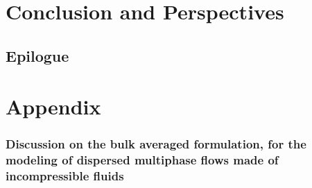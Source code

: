 \documentclass[
    a4paper,                            %
    12pt,                               %
    twoside,                            %
    open=right,                         %
]{My_book}
\begin{document}


\part*{Conclusion and Perspectives}


\chapter*{Epilogue}




\appendix
\renewcommand{\thesection}{\Alph{section}}
\renewcommand{\thesubsection}{\Alph{section}.\arabic{subsection}}
\part*{Appendix}








% 
% 
% 
% 
% 
% 
















\section{
Discussion on the bulk averaged formulation, for the modeling of dispersed multiphase flows made of incompressible fluids
}
\label{ap:momentum_formulation}




\end{document}
